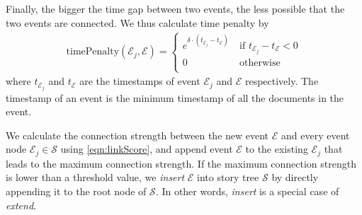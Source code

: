 Finally, the bigger the time gap between two events, the less possible that the two events are connected. We thus calculate time penalty by
\begin{align}
  \text{timePenalty}(\mathcal{E}_j, \mathcal{E}) = \begin{cases}
  e^{\delta \cdot (t_{\mathcal{E}_j} - t_{\mathcal{E}})}
   &\ \text{if } t_{\mathcal{E}_j} - t_{\mathcal{E}} < 0\\
  0 &\ \text{otherwise}\\
  \end{cases}
\end{align}
where $t_{\mathcal{E}_j}$ and  $t_{\mathcal{E}}$ are the timestamps of event $\mathcal{E}_j$ and $\mathcal{E}$ respectively. The timestamp of an event is the minimum timestamp of all the documents in the event.

We calculate the connection strength between the new event $\mathcal{E}$ and every event node $\mathcal{E}_j \in \mathcal{S}$ using \eqref{eqn:linkScore}, and append event $\mathcal{E}$ to the existing $\mathcal{E}_j$ that leads to the maximum connection strength. 
If the maximum connection strength is lower than a threshold value, we \textit{insert} $\mathcal{E}$ into story tree $\mathcal{S}$ by directly appending it to the root node of $\mathcal{S}$. In other words, \emph{insert} is a special case of \emph{extend}.


